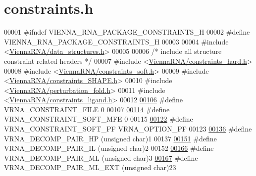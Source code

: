 \hypertarget{constraints_8h_source}{}\section{constraints.\+h}
\label{constraints_8h_source}

\begin{DoxyCode}
00001 \textcolor{preprocessor}{#ifndef VIENNA\_RNA\_PACKAGE\_CONSTRAINTS\_H}
00002 \textcolor{preprocessor}{#define VIENNA\_RNA\_PACKAGE\_CONSTRAINTS\_H}
00003 
00004 \textcolor{preprocessor}{#include <\mbox{\hyperlink{data__structures_8h}{ViennaRNA/data\_structures.h}}>}
00005 
00006 \textcolor{comment}{/* include all structure constraint related headers */}
00007 \textcolor{preprocessor}{#include <\mbox{\hyperlink{constraints__hard_8h}{ViennaRNA/constraints\_hard.h}}>}
00008 \textcolor{preprocessor}{#include <\mbox{\hyperlink{constraints__soft_8h}{ViennaRNA/constraints\_soft.h}}>}
00009 \textcolor{preprocessor}{#include <\mbox{\hyperlink{constraints___s_h_a_p_e_8h}{ViennaRNA/constraints\_SHAPE.h}}>}
00010 \textcolor{preprocessor}{#include <\mbox{\hyperlink{perturbation__fold_8h}{ViennaRNA/perturbation\_fold.h}}>}
00011 \textcolor{preprocessor}{#include <\mbox{\hyperlink{constraints__ligand_8h}{ViennaRNA/constraints\_ligand.h}}>}
00012 
\mbox{\hyperlink{group__constraints_ga62e0ed0c33002c09423de4e646f85a2b}{00106}} \textcolor{preprocessor}{#define VRNA\_CONSTRAINT\_FILE      0}
00107 
\mbox{\hyperlink{group__constraints_ga62aa195893d02d1a79ca94952748df36}{00114}} \textcolor{preprocessor}{#define VRNA\_CONSTRAINT\_SOFT\_MFE  0}
00115 
\mbox{\hyperlink{group__constraints_ga03fb5000c19b9a2082bf4ea30a543045}{00122}} \textcolor{preprocessor}{#define VRNA\_CONSTRAINT\_SOFT\_PF   VRNA\_OPTION\_PF}
00123 
\mbox{\hyperlink{group__constraints_ga8bd41ebc8039378d242e4e8c273716a5}{00136}} \textcolor{preprocessor}{#define VRNA\_DECOMP\_PAIR\_HP     (unsigned char)1}
00137 
\mbox{\hyperlink{group__constraints_gaeab04f34d7730cff2d651d782f95d857}{00151}} \textcolor{preprocessor}{#define VRNA\_DECOMP\_PAIR\_IL     (unsigned char)2}
00152 
\mbox{\hyperlink{group__constraints_gaa15b1185673f0b9e900c4748d45f388f}{00166}} \textcolor{preprocessor}{#define VRNA\_DECOMP\_PAIR\_ML     (unsigned char)3}
\mbox{\hyperlink{constraints_8h_a4a45c80a4d6c64bdbee78ae1fef02c21}{00167}} \textcolor{preprocessor}{#define VRNA\_DECOMP\_PAIR\_ML\_EXT     (unsigned char)23}

\end{DoxyCode}
